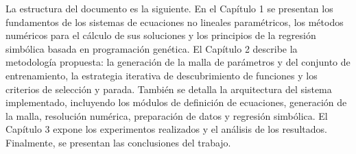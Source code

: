 \documentclass{article} \usepackage[utf8]{inputenc} \usepackage[spanish]{babel} \usepackage{amsmath, amssymb, amsthm} \usepackage{bm} \usepackage{float} \usepackage{longtable} \usepackage[hidelinks]{hyperref}
\begin{document}
La estructura del documento es la siguiente.  En el Capítulo 1 se presentan los fundamentos de los sistemas de ecuaciones no lineales paramétricos, los métodos numéricos para el cálculo de sus soluciones y los principios de la regresión simbólica basada en programación genética.  El Capítulo 2 describe la metodología propuesta: la generación de la malla de parámetros y del conjunto de entrenamiento, la estrategia iterativa de descubrimiento de funciones y los criterios de selección y parada.  También se detalla la arquitectura del sistema implementado, incluyendo los módulos de definición de ecuaciones, generación de la malla, resolución numérica, preparación de datos y regresión simbólica.  El Capítulo 3 expone los experimentos realizados y el análisis de los resultados.  Finalmente, se presentan las conclusiones del trabajo. \newpage   
\end{document}
